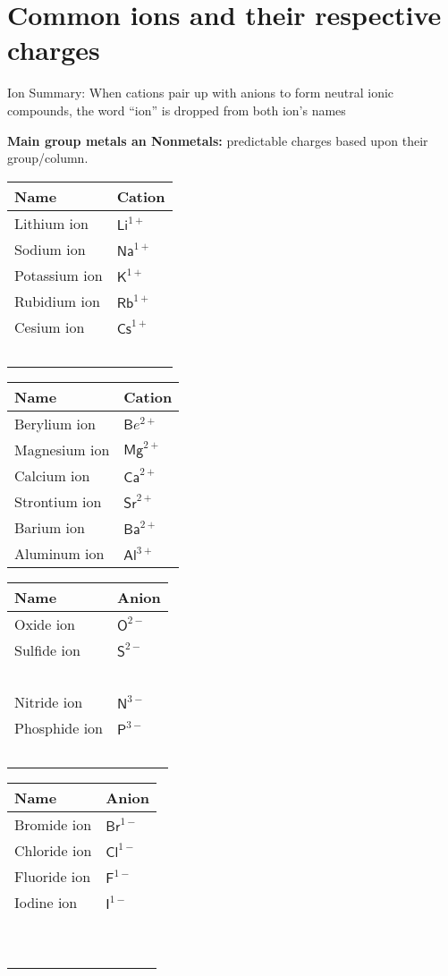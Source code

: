 \documentclass{article}
\theoremstyle{mytheoremstyle}
\theoremstyle{mytheoremstyle}
\theoremstyle{myproblemstyle}
\begin{document}
\section{Common ions and their respective charges}

Ion Summary: When cations pair up with anions to form neutral ionic compounds, the word ``ion'' is dropped from both ion's names

\textbf{Main group metals an Nonmetals:} predictable charges based upon their group/column.

\begin{tabular}{ll}
    \textbf{Name} & \textbf{Cation} \\
    \hline
    Lithium ion   & \(\mathsf {Li}^{1+}\) \\
    Sodium ion    & \(\mathsf {Na}^{1+}\) \\
    Potassium ion & \(\mathsf K^{1+}\)    \\
    Rubidium ion  & \(\mathsf {Rb}^{1+}\) \\
    Cesium ion    & \(\mathsf {Cs}^{1+}\) \\
    ~             &
\end{tabular}
\begin{tabular}{ll}
    \textbf{Name} & \textbf{Cation} \\
    \hline
    Berylium ion  & \(\mathsf {B}e^{2+}\) \\
    Magnesium ion & \(\mathsf {Mg}^{2+}\) \\
    Calcium ion   & \(\mathsf {Ca}^{2+}\) \\
    Strontium ion & \(\mathsf {Sr}^{2+}\) \\
    Barium ion    & \(\mathsf {Ba}^{2+}\) \\
    Aluminum ion  & \(\mathsf {Al}^{3+}\) \\
\end{tabular}

\begin{tabular}{ll}
    \textbf{Name} & \textbf{Anion} \\
    \hline
    Oxide ion     & \(\mathsf O^{2-}\) \\
    Sulfide ion   & \(\mathsf S^{2-}\) \\
    ~             &              \\
    Nitride ion   & \(\mathsf N^{3-}\) \\
    Phosphide ion & \(\mathsf P^{3-}\) \\
    ~             &              \\
\end{tabular}
\begin{tabular}{ll}
    \textbf{Name} & \textbf{Anion} \\
    \hline
    Bromide ion  & \(\mathsf {Br}^{1-}\) \\
    Chloride ion & \(\mathsf {Cl}^{1-}\) \\
    Fluoride ion & \(\mathsf F^{1-}\)    \\
    Iodine ion   & \(\mathsf I^{1-}\)    \\
    ~            &                 \\
    ~            &                 \\
\end{tabular}
\end{document}

